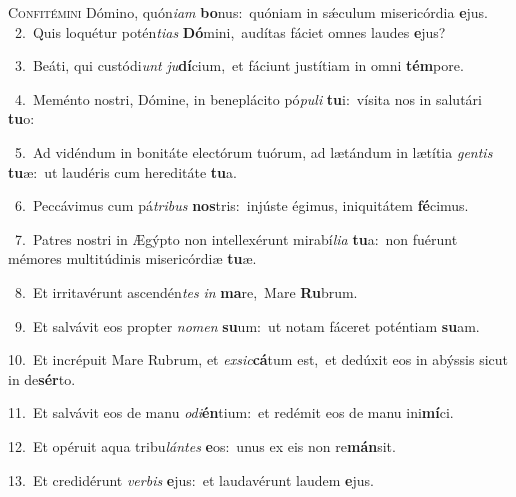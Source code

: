 \lettrine{\initial\textcolor{\initialcolor}{C}}{onfitémini} Dómino, quón\-\textit{i}\-\textit{am} \textbf{bo}\-nus:~\star quóniam in sǽculum misericórdia \textbf{e}\-jus.\\
{\numbfont\textcolor{\numbcolor}{~2.}}~Quis loquétur potén\-\textit{ti}\-\textit{as} \textbf{Dó}\-mini,~\star audítas fáciet omnes laudes \textbf{e}\-jus?\par
{\numbfont\textcolor{\numbcolor}{~3.}}~Beáti, qui custódi\textit{unt} \textit{ju}\-\textbf{dí}cium,~\star et fáciunt justítiam in omni \textbf{tém}\-pore.\par
{\numbfont\textcolor{\numbcolor}{~4.}}~Meménto nostri, Dómine, in beneplácito pó\-\textit{pu}\-\textit{li} \textbf{tu}\-i:~\star vísita nos in salutári \textbf{tu}\-o:\par
{\numbfont\textcolor{\numbcolor}{~5.}}~Ad vidéndum in bonitáte electórum tuórum, ad lætándum in lætítia \textit{gen}\-\textit{tis} \textbf{tu}\-æ:~\star ut laudéris cum hereditáte \textbf{tu}\-a.\par
{\numbfont\textcolor{\numbcolor}{~6.}}~Peccávimus cum pá\-\textit{tri}\-\textit{bus} \textbf{nos}\-tris:~\star injúste égimus, iniquitátem \textbf{fé}\-cimus.\par
{\numbfont\textcolor{\numbcolor}{~7.}}~Patres nostri in Ægýpto non intellexérunt mirabí\-\textit{li}\-\textit{a} \textbf{tu}\-a:~\star non fuérunt mémores multitúdinis misericórdiæ \textbf{tu}\-æ.\par
{\numbfont\textcolor{\numbcolor}{~8.}}~Et irritavérunt ascendén\textit{tes} \textit{in} \textbf{ma}\-re,~\star Mare \textbf{Ru}\-brum.\par
{\numbfont\textcolor{\numbcolor}{~9.}}~Et salvávit eos propter \textit{no}\-\textit{men} \textbf{su}\-um:~\star ut notam fáceret poténtiam \textbf{su}\-am.\par
{\numbfont\textcolor{\numbcolor}{10.}}~Et incrépuit Mare Rubrum, et \textit{ex}\-\textit{sic}\textbf{cá}tum est,~\star et dedúxit eos in abýssis sicut in de\-\textbf{sér}\-to.\par
{\numbfont\textcolor{\numbcolor}{11.}}~Et salvávit eos de manu \textit{o}\-\textit{di}\textbf{én}tium:~\star et redémit eos de manu ini\-\textbf{mí}\-ci.\par
{\numbfont\textcolor{\numbcolor}{12.}}~Et opéruit aqua tribu\-\textit{lán}\-\textit{tes} \textbf{e}\-os:~\star unus ex eis non re\-\textbf{mán}\-sit.\par
{\numbfont\textcolor{\numbcolor}{13.}}~Et credidérunt \textit{ver}\-\textit{bis} \textbf{e}\-jus:~\star et laudavérunt laudem \textbf{e}\-jus.\par
